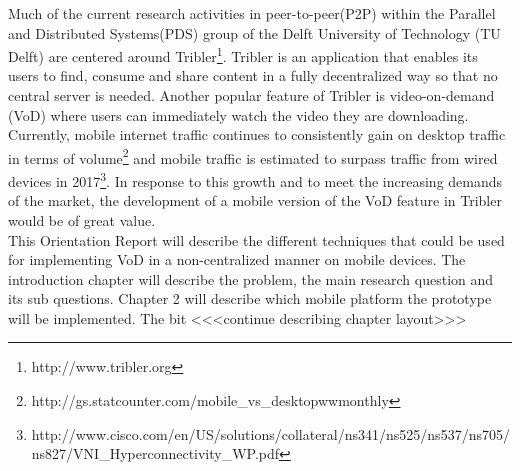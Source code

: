 Much of the current research activities in peer-to-peer(P2P) within the Parallel and Distributed Systems(PDS) group of the Delft University of Technology (TU Delft) are centered around Tribler\footnote{http://www.tribler.org}. Tribler is an application that enables its users to find, consume and share content in a fully decentralized way so that no central server is needed. Another popular feature of Tribler is video-on-demand (VoD) where users can immediately watch the video they are downloading. Currently, mobile internet traffic continues to consistently gain on desktop traffic in terms of volume\footnote{http://gs.statcounter.com/mobile\_vs\_desktop\-ww\-monthly} and mobile traffic is estimated to surpass traffic from wired devices in 2017\footnote{http://www.cisco.com/en/US/solutions/collateral/ns341/ns525/ns537/ns705/ns827/VNI\_Hyperconnectivity\_WP.pdf}. In response to this growth and to meet the increasing demands of the market, the development of a mobile version of the VoD feature in Tribler would be of great value.\\
This Orientation Report will describe the different techniques that could be used for implementing VoD in a non-centralized manner on mobile devices. The introduction chapter will describe the problem, the main research question and its sub questions. Chapter 2 will describe which mobile platform the prototype will be implemented. The bit <<<continue describing chapter layout>>>  